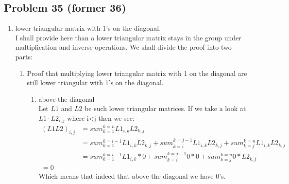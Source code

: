 \documentclass[a4paper,11pt]{article}
\begin{document}
\subsection*{Problem 35 (former 36)}
\begin{enumerate}
\item lower triangular matrix with 1's on the diagonal.\\
I shall provide here than a lower triangular matrix stays in the group under multiplication and inverse operations. We shall divide the proof into two parts: 
\begin{enumerate}
\item Proof that multiplying lower triangular matrix with 1 on the diagonal are still lower triangular with 1's on the diagonal. 
\begin{enumerate}
\item above the diagonal\\
Let $L1$ and $L2$ be such lower triangular matrices. If we take a look at $L1 \cdot L2_{i,j}$ where i<j then we see:
\begin{align}
(L1L2)_{i,j} &= sum_{k=1}^{k=n} L1_{i,k}L2_{k,j}  \\
&= sum_{k=1}^{k=i-1} L1_{i,k}L2_{k,j} + sum_{k=i}^{k=j-1} L1_{i,k}L2_{k,j} + sum_{k=j}^{k=n} L1_{i,k}L2_{k,j} \\
&= sum_{k=1}^{k=i-1} L1_{i,k}*0 + sum_{k=i}^{k=j-1} 0*0 + sum_{k=j}^{k=n} 0*L2_{k,j} \\
= 0
\end{align}
Which means that indeed that above the diagonal we have 0's.\\


\end{enumerate}
\end{enumerate}
\end{enumerate}
\end{document}
